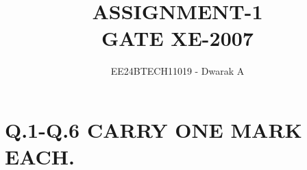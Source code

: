 \documentclass[journal,12pt,twocolumn]{IEEEtran}
\theoremstyle{remark}
\begin{document}

\vspace{3cm}

\title{\textbf{ASSIGNMENT-1\\GATE XE-2007}}
\author{EE24BTECH11019 - Dwarak A}
\maketitle
\newpage
\bigskip

\renewcommand{\thefigure}{\theenumi}
\renewcommand{\thetable}{\theenumi}

\section*{Q.1-Q.6 CARRY ONE MARK EACH.}

\bigskip
\end{document}

